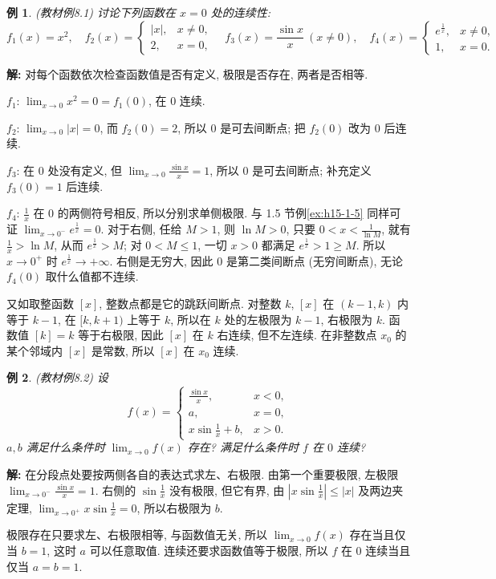 \documentclass[UTF8,openany]{ctexbook}
\theoremstyle{chinesetextbook}
\newtheorem{example}{例}[section]
\newenvironment{cnsolution}{\par\indent\textbf{解:} \ignorespaces}{\par}
\begin{document}
\begin{example}\label{ex:8-1}
\textnormal{(教材例8.1)} 讨论下列函数在 $x=0$ 处的连续性:
\[
f_1(x)=x^2,\quad f_2(x)=\begin{cases}|x|,&x\ne0,\\2,&x=0,\end{cases}\quad f_3(x)=\frac{\sin x}x\ (x\ne0),\quad f_4(x)=\begin{cases}e^{\frac1x},&x\ne0,\\1,&x=0.\end{cases}
\]
\end{example}
\begin{cnsolution}
对每个函数依次检查函数值是否有定义, 极限是否存在, 两者是否相等.

$f_1$: $\displaystyle\lim_{x\to0}x^2=0=f_1(0)$, 在 $0$ 连续.

$f_2$: $\displaystyle\lim_{x\to0}|x|=0$, 而 $f_2(0)=2$, 所以 $0$ 是可去间断点; 把 $f_2(0)$ 改为 $0$ 后连续.

$f_3$: 在 $0$ 处没有定义, 但 $\displaystyle\lim_{x\to0}\frac{\sin x}x=1$, 所以 $0$ 是可去间断点; 补充定义 $f_3(0)=1$ 后连续.

$f_4$: $\displaystyle\frac1x$ 在 $0$ 的两侧符号相反, 所以分别求单侧极限. 与 1.5 节例\ref{ex:h15-1-5} 同样可证 $\displaystyle\lim_{x\to0^-}e^{\frac1x}=0$. 对于右侧, 任给 $M>1$, 则 $\ln M>0$, 只要 $\displaystyle0<x<\frac1{\ln M}$, 就有 $\displaystyle\frac1x>\ln M$, 从而 $e^{\frac1x}>M$; 对 $0<M\le1$, 一切 $x>0$ 都满足 $e^{\frac1x}>1\ge M$. 所以 $x\to0^+$ 时 $e^{\frac1x}\to+\infty$. 右侧是无穷大, 因此 $0$ 是第二类间断点 (无穷间断点), 无论 $f_4(0)$ 取什么值都不连续.
\end{cnsolution}
又如取整函数 $[x]$, 整数点都是它的跳跃间断点. 对整数 $k$, $[x]$ 在 $(k-1,k)$ 内等于 $k-1$, 在 $[k,k+1)$ 上等于 $k$, 所以在 $k$ 处的左极限为 $k-1$, 右极限为 $k$. 函数值 $[k]=k$ 等于右极限, 因此 $[x]$ 在 $k$ 右连续, 但不左连续. 在非整数点 $x_0$ 的某个邻域内 $[x]$ 是常数, 所以 $[x]$ 在 $x_0$ 连续.
\begin{example}
\textnormal{(教材例8.2)} 设
\[
f(x)=\begin{cases}\frac{\sin x}x,&x<0,\\a,&x=0,\\x\sin\frac1x+b,&x>0.\end{cases}
\]
$a,b$ 满足什么条件时 $\displaystyle\lim_{x\to0}f(x)$ 存在? 满足什么条件时 $f$ 在 $0$ 连续?
\end{example}
\begin{cnsolution}
在分段点处要按两侧各自的表达式求左、右极限. 由第一个重要极限, 左极限 $\displaystyle\lim_{x\to0^-}\frac{\sin x}x=1$. 右侧的 $\displaystyle\sin\frac1x$ 没有极限, 但它有界, 由 $\displaystyle\left|x\sin\frac1x\right|\le|x|$ 及两边夹定理, $\displaystyle\lim_{x\to0^+}x\sin\frac1x=0$, 所以右极限为 $b$.

极限存在只要求左、右极限相等, 与函数值无关, 所以 $\displaystyle\lim_{x\to0}f(x)$ 存在当且仅当 $b=1$, 这时 $a$ 可以任意取值. 连续还要求函数值等于极限, 所以 $f$ 在 $0$ 连续当且仅当 $a=b=1$.
\end{cnsolution}
\end{document}
